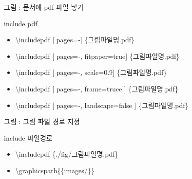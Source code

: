 \documentclass[ aspectratio=149,  10pt,blue,xcolor=pdftex,dvipsnames,table,handout,notes]{beamer}
\begin{document}

		\begin{frame}[t]{그림 : 문서에 pdf 파일 넣기}

			\begin{block} {include pdf}
			\begin{itemize}
			\item[]	\textbackslash includepdf [ pages=-] \{그림파일명.pdf\}
			\item[]	\textbackslash includepdf [ pages=-, fitpaper=true] \{그림파일명.pdf\}
			\item[]	\textbackslash includepdf [ pages=-, scale=0.9] \{그림파일명.pdf\}
			\item[]	\textbackslash includepdf [ pages=-, frame=truee ] \{그림파일명.pdf\}
			\item[]	\textbackslash includepdf [ pages=-, landscape=false ] \{그림파일명.pdf\}
			\end{itemize}
			\end{block}


		\end{frame}



		\begin{frame}[t]{그림 : 그림 파일 경로 지정}

			\begin{block} {include 파일경로}
			\begin{itemize}
			\item[]	\textbackslash includepdf \{./fig/그림파일명.pdf\}
			\item[]	\textbackslash graphicspath\{\{images/\}\}   

			\end{itemize}
			\end{block}


		\end{frame}
\end{document}
